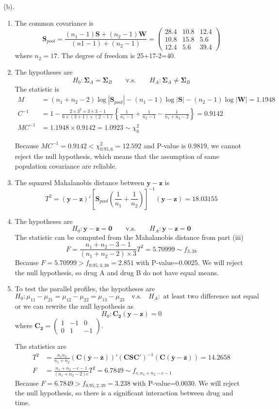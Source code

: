 \documentclass[letterpaper, 12pt]{article}
\newcommand{\ba}{$$\begin{aligned}}
\newcommand{\ea}{\end{aligned}$$}
\newcommand{\lma}{\left(\begin{matrix}}
\newcommand{\rma}{\end{matrix}\right)}
\begin{document}
(b). \begin{enumerate}[i]
\item The common covariance is
$$
\bm{S}_{pool}=\frac{(n_1-1)\bm{S}+(n_2-1)\bm{W}}{(n1-1)+(n_2-1)}=\lma 28.4 &10.8 & 12.4\\10.8 &15.8 &5.6\\12.4 & 5.6 &39.4\rma
$$
where $n_2=17$. The degree of freedom is 25+17-2=40.
\item The hypotheses are 
$$
H_0:\bm{\Sigma}_A=\bm{\Sigma}_B\qquad\text{v.s.}\qquad H_A:\bm{\Sigma}_A\not=\bm{\Sigma}_B
$$
The statistic is
\ba
M&=(n_1+n_2-2)\log|\bm{S}_{pool}|-(n_1-1)\log|\bm{S}|-(n_2-1)\log|\bm{W}|=1.1948\\
C^{-1}&=1-\frac{2\times3^2+3\times3-1}{6\times(3+1)\times(2-1)}\left\{\frac{1}{n_1-1}+\frac{1}{n_2-1}-\frac{1}{n_1+n_2-2}\right\}=0.9142\\
MC^{-1}&=1.1948\times0.9142=1.0923\sim\chi^2_{6}
\ea

Because $MC^{-1}=0.9142<\chi^2_{0.95,6}=12.592$ and P-value is 0.9819, we cannot reject the null hypothesis, which means that the assumption of same population covariance are reliable.

\item The squared Mahalanobis distance between $\bm{y}-\bm{z}$ is
$$
T^2=(\bm{y}-\bm{z})'\left[\bm{S}_{pool}\left(\frac{1}{n_1}+\frac{1}{n_2}\right)\right]^{-1}(\bm{y}-\bm{z})=18.03155
$$


\item The hypotheses are
$$
H_0:\bm{y}-\bm{z}=\bm{0}\qquad\text{v.s.}\qquad H_A:\bm{y}-\bm{z}=\bm{0}
$$
The statistic can be computed from the Mahalanobis distance from part (iii)
$$
F=\frac{n_1+n_2-3-1}{(n_1+n_2-2)\times3}T^2=5.70999\sim f_{3,38}
$$
Because $F=5.70999>f_{0.95,3,38}=2.851$ with P-value=0.0025. We will reject the null hypothesis, so drug A and drug B do not have equal means.
\item To test the parallel profiles, the hypotheses are
$$
H_0:\mu_{11}-\mu_{21}=\mu_{12}-\mu_{22}=\mu_{13}-\mu_{23}\quad\text{v.s.}\quad H_A: \text{ at least two difference not equal}
$$
or we can rewrite the null hypothesis as
$$
H_0:\bm{C_2}(\bm{y}-\bm{z})=0
$$
where $\bm{C_2}=\lma 1 &-1 &0\\ 0 &1 &-1\rma$. 

The statistics are
\ba
T^2&=\frac{n_1n_2}{n_1+n_2}(\bm{C(\bar{y}-\bar{z})})'(\bm{CSC}')^{-1}(\bm{C(\bar{y}-\bar{z})})=14.2658\\
F&=\frac{n_1+n_2-c-1}{(n_1+n_2-2)c}T^2=6.7849\sim f_{c,n_1+n_2-c-1}
\ea
Because $F=6.7849>f_{0.95,2,39}=3.238$ with P-value=0.0030. We will reject the null hypothesis, so there is a significant interaction between drug and time.



\end{enumerate}
\end{document}
